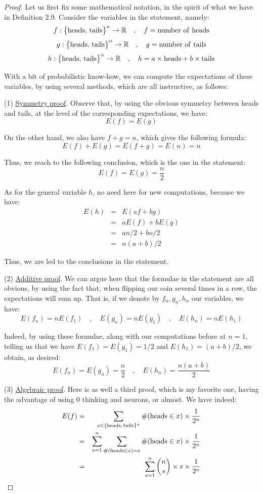 \documentclass[12pt]{amsbook}
\begin{document}
\begin{proof}
Let us first fix some mathematical notation, in the spirit of what we have in Definition 2.9. Consider the variables in the statement, namely:
$$f:\big\{{\rm heads},\,{\rm tails}\big\}^n\to\mathbb R\quad,\quad f={\rm number\ of\ heads}$$ 
$$g:\big\{{\rm heads},\,{\rm tails}\big\}^n\to\mathbb R\quad,\quad g={\rm number\ of\ tails}$$ 
$$h:\big\{{\rm heads},\,{\rm tails}\big\}^n\to\mathbb R\quad,\quad h=a\times{\rm heads}+b\times{\rm tails}$$ 

With a bit of probabilistic know-how, we can compute the expectations of these variables, by using several methods, which are all instructive, as follows:

\medskip

(1) \underline{Symmetry proof}. Observe that, by using the obvious symmetry between heads and tails, at the level of the corresponding expectations, we have:
$$E(f)=E(g)$$

On the other hand, we also have $f+g=n$, which gives the following formula:
$$E(f)+E(g)=E(f+g)=E(n)=n$$

Thus, we reach to the following conclusion, which is the one in the statement:
$$E(f)=E(g)=\frac{n}{2}$$

As for the general variable $h$, no need here for new computations, because we have:
\begin{eqnarray*}
E(h)
&=&E(af+bg)\\
&=&aE(f)+bE(g)\\
&=&an/2+bn/2\\
&=&n(a+b)/2
\end{eqnarray*}

Thus, we are led to the conclusions in the statement.

\medskip

(2) \underline{Additive proof}. We can argue here that the formulae in the statement are all obvious, by using the fact that, when flipping our coin several times in a row, the expectations will sum up. That is, if we denote by $f_n,g_n,h_n$ our variables, we have:
$$E(f_n)=nE(f_1)\quad,\quad E(g_n)=nE(g_1)\quad,\quad E(h_n)=nE(h_1)$$

Indeed, by using these formulae, along with our computations before at $n=1$, telling us that we have $E(f_1)=E(g_1)=1/2$ and $E(h_1)=(a+b)/2$, we obtain, as desired:
$$E(f_n)=E(g_n)=\frac{n}{2}\quad,\quad E(h_n)=\frac{n(a+b)}{2}$$

(3) \underline{Algebraic proof}. Here is as well a third proof, which is my favorite one, having the advantage of using 0 thinking and neurons, or almost. We have indeed:
\begin{eqnarray*}
E(f)
&=&\sum_{x\in\{{\rm heads,\, tails}\}^n}\#({\rm heads}\in x)\times\frac{1}{2^n}\\
&=&\sum_{s=1}^n\sum_{\#({\rm heads}\in x)=s}\#({\rm heads}\in x)\times\frac{1}{2^n}\\
&=&\sum_{s=1}^n\binom{n}{s}\times s\times\frac{1}{2^n}
\end{eqnarray*}


\end{proof}
\end{document}
